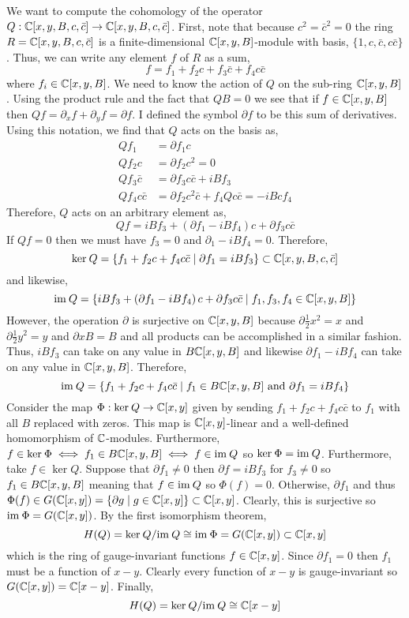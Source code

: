 \documentclass[12pt]{article}
\begin{document}
We want to compute the cohomology of the operator $Q : \mathbb{C}[x,y,B,c,\bar{c}] \to \mathbb{C}[x,y,B,c,\bar{c}]$. First, note that because $c^2 = \bar{c}^2 = 0$ the ring $R = \mathbb{C}[x,y,B,c,\bar{c}]$ is a finite-dimensional $\mathbb{C}[x,y,B]$-module with basis, $\{1, c, \bar{c}, c \bar{c} \}$. Thus, we can write any element $f$ of $R$ as a sum,
\[ f = f_1 + f_2 c + f_3 \bar{c} + f_4 c \bar{c} \]
where $f_i \in \mathbb{C}[x,y,B]$. We need to know the action of $Q$ on the sub-ring $\mathbb{C}[x,y,B]$. Using the product rule and the fact that $Q B = 0$ we see that if $f \in \mathbb{C}[x,y,B]$ then $Q f = \partial_x f + \partial_y f = \partial f$. I defined the symbol $\partial f$ to be this sum of derivatives. Using this notation, we find that $Q$ acts on the basis as,
\begin{align*}
Q f_1 & = \partial f_1 c
\\
Q f_2 c & = \partial f_2 c^2 = 0
\\
Q f_3 \bar{c} & = \partial f_3 c \bar{c} + i B f_3
\\
Q f_4 c \bar{c} & = \partial f_2 c^2 \bar{c} + f_4 Q c \bar{c} = - i B c f_4  
\end{align*}
Therefore, $Q$ acts on an arbitrary element as,
\[ Qf = i B f_3 + \left( \partial f_1 - i B f_4 \right) c + \partial f_3 c \bar{c} \]
If $Q f = 0$ then we must have $f_3 = 0$ and $\partial_1 - i B f_4 = 0$. Therefore,
\[ \mathrm{ker} \: Q = \{f_1 + f_2 c + f_4 c \bar{c} \mid \partial f_1 = i B f_3 \}  \subset \mathbb{C}[x,y,B,c,\bar{c}] \]
and likewise,
\[ \mathrm{im} \: Q = \{ iB f_3 + \left( \partial f_1 - i B f_4 \right) c + \partial f_3 c \bar{c} \mid f_1, f_3, f_4 \in \mathbb{C}[x,y,B] \} \]
However, the operation $\partial$ is surjective on $\mathbb{C}[x,y,B]$ because $\partial \tfrac{1}{2} x^2 = x$ and $\partial \tfrac{1}{2} y^2 = y$ and $\partial x B = B$ and all products can be accomplished in a similar fashion. Thus, $i B f_3$ can take on any value in $B \mathbb{C}[x,y,B]$ and likewise $\partial f_1 - i B f_4$ can take on any value in $\mathbb{C}[x,y,B]$. Therefore,
\[ \mathrm{im} \: Q = \{ f_1 + f_2 c + f_4 c \bar{c} \mid f_1 \in B \mathbb{C}[x,y,B] \text{ and } \partial f_1 = i B f_4 \} \] 
Consider the map $\Phi : \mathrm{ker} \: Q \to \mathbb{C}[x, y]$ given by sending $f_1 + f_2 c + f_4 c \bar{c}$ to $f_1$ with all $B$ replaced with zeros. This map is $\mathbb{C}[x,y]$-linear and a well-defined homomorphism of $\mathbb{C}$-modules. Furthermore, $f \in \mathrm{ker} \: \Phi \iff f_1 \in B \mathbb{C}[x,y,B] \iff f \in \mathrm{im} \: Q$ so $\mathrm{ker} \: \Phi = \mathrm{im} \: Q$. Furthermore,
take $f \in \ker{Q}$. Suppose that $\partial f_1 \neq 0$ then $\partial f = i B f_3$ for $f_3 \neq 0$ so $f_1 \in B \mathbb{C}[x, y, B]$ meaning that $f \in \mathrm{im} \: Q$ so $\Phi(f) = 0$. Otherwise, $\partial f_1$ and thus $\Phi(f) \in G(\mathbb{C}[x,y]) = \{ \partial g \mid g \in \mathbb{C}[x,y] \} \subset \mathbb{C}[x,y]$. Clearly, this is surjective so $\mathrm{im} \: \Phi = G(\mathbb{C}[x,y])$.
By the first isomorphism theorem,
\[ H(Q) = \mathrm{ker} \: Q / \mathrm{im} \: Q \cong \mathrm{im} \: \Phi = G(\mathbb{C}[x,y]) \subset \mathbb{C}[x,y] \]
which is the ring of gauge-invariant functions $f \in \mathbb{C}[x,y]$. Since $\partial f_1 = 0$ then $f_1$ must be a function of $x - y$. Clearly every function of $x - y$ is gauge-invariant so $G(\mathbb{C}[x,y]) = \mathbb{C}[x-y]$. Finally,
\[ H(Q) = \mathrm{ker} \: Q / \mathrm{im} \: Q \cong \mathbb{C}[x-y] \]
\end{document}
